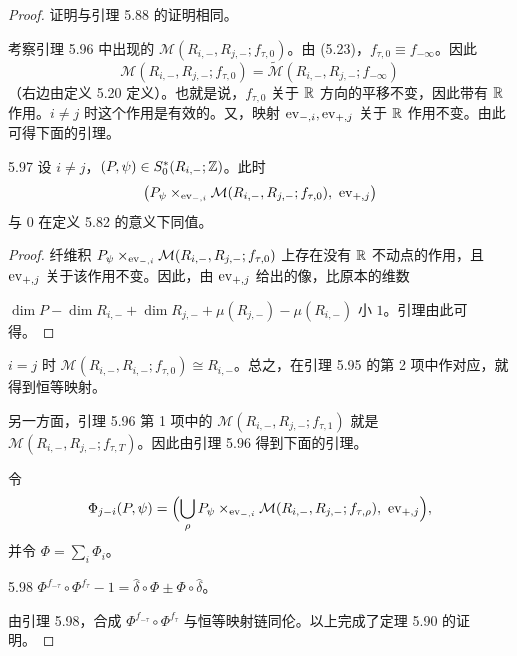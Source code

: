 \begin{proof}
证明与引理 5.88 的证明相同。

考察引理 5.96 中出现的 $\mathcal{M}(R_{i,-},R_{j,-};f_{\tau,0})$。由 (5.23)，$f_{\tau,0}\equiv f_{-\infty}$。因此
\[
\mathcal{M}(R_{i,-},R_{j,-};f_{\tau,0})=\tilde{\mathcal{M}}(R_{i,-},R_{j,-};f_{-\infty})
\]
（右边由定义 5.20 定义）。也就是说，$f_{\tau,0}$ 关于 $\mathbb{R}$ 方向的平移不变，因此带有 $\mathbb{R}$ 作用。$i\neq j$ 时这个作用是有效的。又，映射 $\operatorname{ev}_{-,i},\operatorname{ev}_{+,j}$ 关于 $\mathbb{R}$ 作用不变。由此可得下面的引理。

\begin{lemma*}{5.97}
  设 $i\neq j$，$(P,\psi)\in S^*_0(R_{i,-};\mathbb{Z})$。此时
  \[
    \bigl(P_\psi\times_{\ev_{-,i}}\mathcal{M}(R_{i,-},R_{j,-};f_{\tau,0}),\ \ev_{+,j}\bigr)
  \]
  与 $0$ 在定义 5.82 的意义下同值。
\end{lemma*}

\begin{proof}
  纤维积 $P_\psi\times_{\operatorname{ev}_{-,i}}\mathcal{M}(R_{i,-},R_{j,-};f_{\tau,0})$ 上存在没有 $\mathbb{R}$ 不动点的作用，且 $\operatorname{ev}_{+,j}$ 关于该作用不变。因此，由 $\operatorname{ev}_{+,j}$ 给出的像，比原本的维数

  $\dim P-\dim R_{i,-}+\dim R_{j,-}+\mu(R_{j,-})-\mu(R_{i,-})$
  小 $1$。引理由此可得。
\end{proof}


$i=j$ 时 $\mathcal{M}(R_{i,-},R_{i,-};f_{\tau,0})\cong R_{i,-}$。总之，在引理 5.95 的第 2 项中作对应，就得到恒等映射。


另一方面，引理 5.96 第 1 项中的 $\mathcal{M}(R_{i,-},R_{j,-};f_{\tau,1})$ 就是 $\mathcal{M}(R_{i,-},R_{j,-};f_{\tau,T})$。因此由引理 5.96 得到下面的引理。

令
\[
\Phi_{j-i}(P,\psi)=\Bigl(\bigcup_\rho P_\psi\times_{\ev_{-,i}}\mathcal{M}(R_{i,-},R_{j,-};f_{\tau,\rho}),\ \ev_{+,j}\Bigr),
\]
并令 $\Phi=\sum_i\Phi_i$。

\begin{lemma}{5.98}
  $\Phi^{f_{-\tau}}\circ\Phi^{f_\tau}-1=\hat\delta\circ\Phi\pm\Phi\circ\hat\delta$。
\end{lemma}

由引理 5.98，合成 $\Phi^{f_{-\tau}}\circ\Phi^{f_\tau}$ 与恒等映射链同伦。以上完成了定理 5.90 的证明。
\end{proof}


